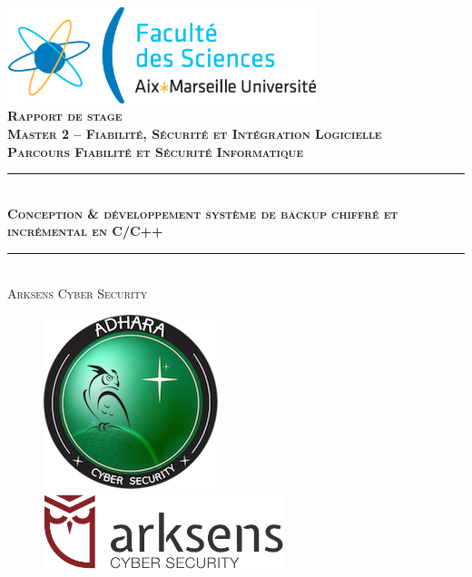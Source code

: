 \documentclass[a4paper,10pt, twoside]{report}
\begin{document}
\begin{spacing}{1.2}
 
\begin{titlepage}
  
  \begin{center}
    \includegraphics[width=9cm]{logo_sciences.png}\\[2cm]
    
    \textsc{\bfseries\Large Rapport de stage\\[0.3cm]
    Master 2 -- Fiabilité, Sécurité et
    Intégration Logicielle\\[0.3cm]
        Parcours Fiabilité et Sécurité Informatique}\\[0.3cm]

    \rule{\linewidth}{1mm} \\[1cm]

    \textsc{\bfseries\huge Conception \&  développement système de backup
    chiffré et incrémental en C/C++}\\[1cm]

    \rule{\linewidth}{1mm}\\[1.5cm]

    \textsc{\huge Arksens Cyber Security}\\[2cm]
    
    \begin{figure}[H]
      \begin{minipage}[t]{8cm}
        \centering
        \includegraphics[scale=0.50]{logo_adhara.png}
      \end{minipage}
      \begin{minipage}[t]{8cm}
        \centering
        \includegraphics[width=7cm]{logo_arksens.png}
      \end{minipage}\\[1.3cm]
    \end{figure}
      

\end{center}
\end{titlepage}
\end{spacing}
\end{document}
